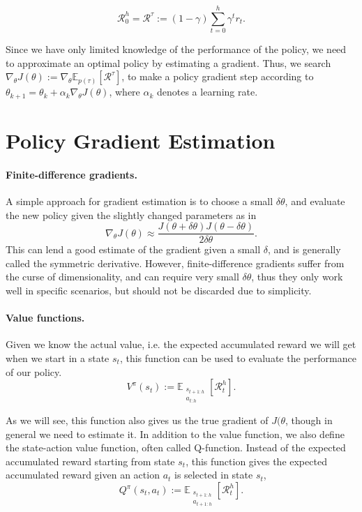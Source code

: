 \begin{equation}
  \mathcal{R}_0^h = \mathcal{R}^\tau := (1-\gamma) \sum_{t=0}^{h} \gamma^t r_t.
  \label{eqn:acc-reward}
\end{equation}

Since we have only limited knowledge of the performance of the policy, we need to approximate an optimal policy by estimating a gradient. 
Thus, we search $\nabla_\theta J(\theta) := \nabla_\theta \mathbb{E}_{p(\tau)}\left[\mathcal{R}^\tau\right]$, to make a policy gradient step according to $\theta_{k+1} = \theta_k + \alpha_k \nabla_\theta J(\theta)$, where $\alpha_k$ denotes a learning rate. 

\section{Policy Gradient Estimation}
\label{sec:pge}

\paragraph{Finite-difference gradients.} 
A simple approach for gradient estimation is to choose a small $\delta\theta$, and evaluate the new policy given the slightly changed parameters as in 
\begin{equation}
	\nabla_\theta J(\theta) \approx \frac{J(\theta+\delta\theta)J(\theta-\delta\theta)}{2\delta\theta}.
\end{equation} 
This can lend a good estimate of the gradient given a small $\delta$, and is generally called the symmetric derivative. 
However, finite-difference gradients suffer from the curse of dimensionality, and can require very small $\delta\theta$, thus they only work well in specific scenarios, but should not be discarded due to simplicity. 

\paragraph{Value functions.} 
Given we know the actual value, i.e. the expected accumulated reward we will get when we start in a state $s_t$, this function can be used to evaluate the performance of our policy.
\begin{equation}
	V^{\pi}(s_t) := \mathbb{E}_{\substack{s_{t+1:h} \\ a_{t:h}}}\left[\mathcal{R}_t^h\right].
	\label{eqn:v}
\end{equation}

As we will see, this function also gives us the true gradient of $J(\theta$, though in general we need to estimate it. 
In addition to the value function, we also define the state-action value function, often called Q-function. 
Instead of the expected accumulated reward starting from state $s_t$, this function gives the expected accumulated reward given an action $a_t$ is selected in state $s_t$, 
\begin{equation}
	Q^{\pi}(s_t, a_t) := \mathbb{E}_{\substack{s_{t+1:h} \\ a_{t+1:h}}}\left[\mathcal{R}_t^h\right].
	\label{eqn:q}
\end{equation}

